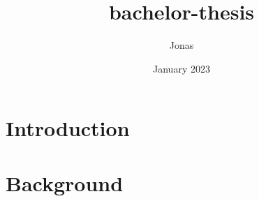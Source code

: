 \documentclass{article}
\title{bachelor-thesis}
\author{Jonas }
\date{January 2023}
\begin{document}
\maketitle

\section{Introduction}
\section{Background}
\end{document}
